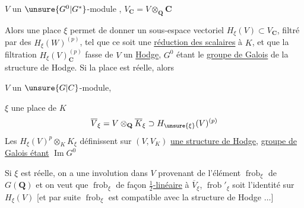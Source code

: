 $V$ un $\unsure{G^0|G^*}$-module , $V_{\mathbf C}=V\otimes_{\mathbf Q}\mathbf C$

Alors une place  $\xi$ permet de donner un sous-espace vectoriel $H_\xi(V)\subset V_{\mathbf C}$, filtré par des $H_\xi(W)^{(p)}$, tel que  ce soit une \uline{réduction des scalaires} à $K$, et que la filtration $H_\xi(V)_{\mathbf C}^{(p)}$ fasse de $V$ un  \uline{Hodge}, $G^0$ étant   le \uline{groupe de Galois} de la structure de Hodge. Si la place est réelle, alors

 $V$ un $\unsure{G|C}$-module,

$\xi$ une place de $K$
\[
\overline V_\xi=V\otimes_{\mathbf Q}\overline K_\xi\supset H_{\unsure{\xi}}(V)^{(p)}
\]
Les $H_\xi(V)^p\otimes_K K_\xi$ définissent sur $(V,V_K)$ \uline{une structure de Hodge},  \uline{groupe de Galois étant}  \uline{ $\operatorname{Im}G^0$}

Si $\xi$ est réelle, on a une involution dans $V$ provenant de l'élément  $\operatorname{frob}_\xi$ de $G(\mathbf Q)$ et on veut que  $\operatorname{frob}_\xi$ de façon \uline{$\frac12$-linéaire} à $\overline V_\xi$, $\operatorname{frob}'_\xi$ soit l'identité sur $H_\xi(V)$ [et par suite $\operatorname{frob}_\xi$ est compatible avec la structure de Hodge $\ldots$]
